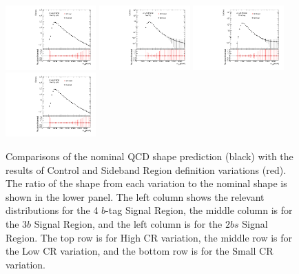 \begin{figure}[htbp!]
\begin{center}
\includegraphics[width=0.31\textwidth,angle=-90]{figures/boosted/Syst_CRSB/CR_Low_compare_TwoTag_split_qcd_hh.pdf}
\includegraphics[width=0.31\textwidth,angle=-90]{figures/boosted/Syst_CRSB/CR_Small_compare_FourTag_qcd_hh.pdf}
\includegraphics[width=0.31\textwidth,angle=-90]{figures/boosted/Syst_CRSB/CR_Small_compare_ThreeTag_qcd_hh.pdf}
\includegraphics[width=0.31\textwidth,angle=-90]{figures/boosted/Syst_CRSB/CR_Small_compare_TwoTag_split_qcd_hh.pdf}
\end{center}
\caption{Comparisons of the nominal QCD shape prediction (black) with the results of Control and Sideband Region definition variations (red). The ratio of the shape from each variation to the nominal shape is shown in the lower panel. The left column shows the relevant distributions for the 4 $b$-tag Signal Region, the middle column is for the $3b$ Signal Region, and the left column is for the $2bs$ Signal Region. The top row is for High CR variation, the middle row is for the Low CR variation, and the bottom row is for the Small CR variation.}
\label{CRSB:QCDShapeSR-CR}
\end{figure}


